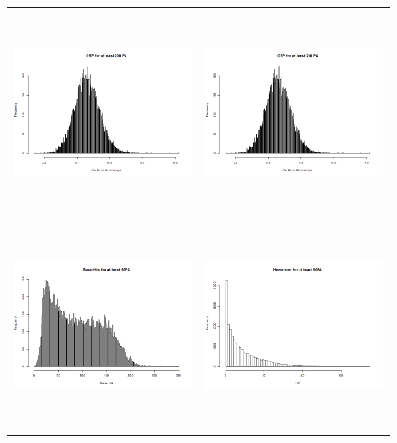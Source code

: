 \documentclass[dvipdfmx]{article}
\begin{document}
\begin{itemize}
  \begin{figure}[H]
   \centering
   \begin{tabular}{cc}
    \includegraphics[width = 8cm, height = 6cm]{graphs/OBP_200PA.png} &
    \includegraphics[width = 8cm, height = 6cm]{graphs/OBP_200PA.png} \\
    \includegraphics[width = 8cm, height = 6cm]{graphs/H_90PA.png} &
    \includegraphics[width = 8cm, height = 6cm]{graphs/HR_90PA.png} \\

\end{tabular}
\end{figure}
\end{itemize}
\end{document}
